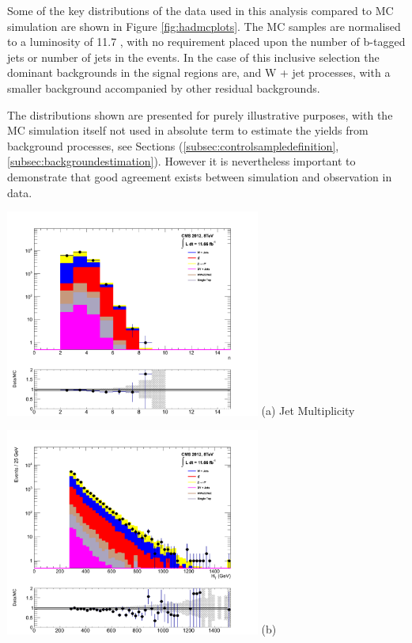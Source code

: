 Some of the key distributions of the data used in this analysis compared to MC simulation are shown in Figure \ref{fig:hadmcplots}. The MC samples are normalised to a luminosity of 11.7 \fb,  with no requirement placed upon the number of b-tagged jets or number of jets in the events. In the case of this inclusive selection the dominant backgrounds in the signal regions are, \zinv and W + jet processes, with a smaller \ttbar background accompanied by other residual backgrounds. 

The distributions shown are presented for purely illustrative purposes, with the MC simulation itself not used in absolute term to estimate the yields from background processes, see Sections (\ref{subsec:controlsampledefinition}, \ref{subsec:backgroundestimation}). However it is nevertheless important to demonstrate that good agreement exists between simulation and observation in data.

\begin{minipage}{\linewidth}
\centering
\begin{minipage}{.48\textwidth}
\centering
\includegraphics[width = 3.3in]{plots/had_njet_datamc.pdf}
(a) Jet Multiplicity
\end{minipage}
\begin{minipage}{.48\textwidth}
\centering
\includegraphics[width = 3.3in]{plots/had_ht_datamc.pdf}
(b) \theht
\end{minipage}
\end{minipage}

